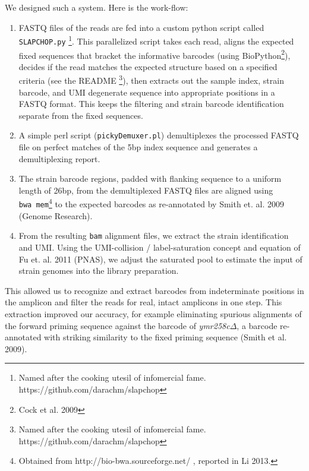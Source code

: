 {We designed such a system. Here is the work-flow:

\begin{enumerate}
\def\labelenumi{\arabic{enumi}.}
\tightlist
\item
  FASTQ files of the reads are fed into a custom python script called
  \texttt{SLAPCHOP.py} \footnote{Named after the cooking utesil of
    infomercial fame. https://github.com/darachm/slapchop}. This
  parallelized script takes each read, aligns the expected fixed
  sequences that bracket the informative barcodes (using
  BioPython\footnote{Cock et al. 2009}), decides if the read matches the
  expected structure based on a specified criteria (see the README
  \footnote{Named after the cooking utesil of infomercial fame.
    https://github.com/darachm/slapchop}), then extracts out the sample
  index, strain barcode, and UMI degenerate sequence into appropriate
  positions in a FASTQ format. This keeps the filtering and strain
  barcode identification separate from the fixed sequences.
\item
  A simple perl script (\texttt{pickyDemuxer.pl}) demultiplexes the
  processed FASTQ file on perfect matches of the 5bp index sequence and
  generates a demultiplexing report.
\item
  The strain barcode regions, padded with flanking sequence to a uniform
  length of 26bp, from the demultiplexed FASTQ files are aligned using
  \texttt{bwa\ mem}\footnote{Obtained from
    http://bio-bwa.sourceforge.net/ , reported in Li 2013.} to the
  expected barcodes as re-annotated by Smith et. al. 2009 (Genome
  Research).
\item
  From the resulting \texttt{bam} alignment files, we extract the strain
  identification and UMI. Using the UMI-collision / label-saturation
  concept and equation of Fu et. al. 2011 (PNAS), we adjust the
  saturated pool to estimate the input of strain genomes into the
  library preparation.
\end{enumerate}

This allowed us to recognize and extract barcodes from indeterminate
positions in the amplicon and filter the reads for real, intact
amplicons in one step. This extraction improved our accuracy, for
example eliminating spurious alignments of the forward priming sequence
against the barcode of \emph{ymr258c}\(\Delta\), a barcode re-annotated
with striking similarity to the fixed priming sequence (Smith et al.
2009).

}
